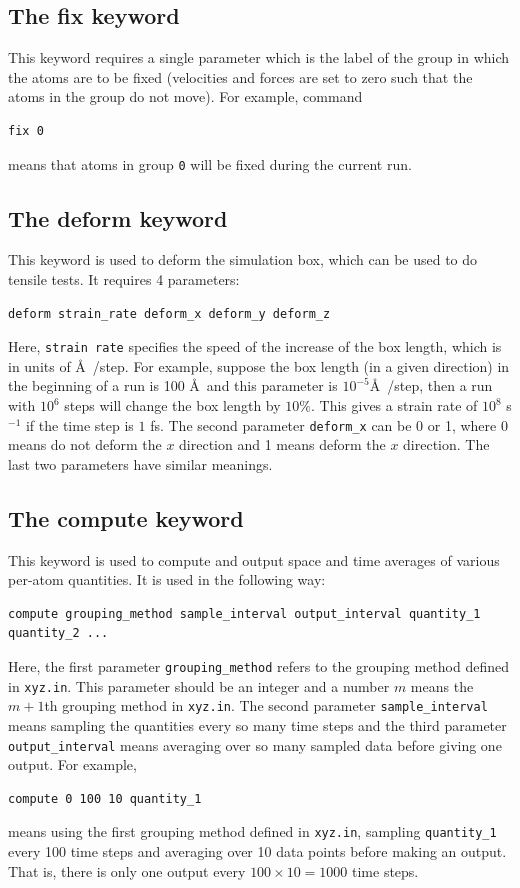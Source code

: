\documentclass[12pt,a4paper]{report}
\begin{document}
\subsection{The fix keyword}

This keyword requires a single parameter which is the label of the group in which the atoms are to be fixed (velocities and forces are set to zero such that the atoms in the group do not move). For example, command
\begin{verbatim}
fix 0
\end{verbatim}
means that atoms in group \verb"0" will be fixed during the current run.


\subsection{The deform keyword}

This keyword is used to deform the simulation box, which can be used to do tensile tests. It requires 4 parameters:
\begin{verbatim}
deform strain_rate deform_x deform_y deform_z
\end{verbatim}
Here, \verb"strain rate" specifies the speed of the increase of the box length, which is in units of \AA~/step. For example, suppose the box length (in a given direction) in the beginning of a run is 100 \AA~and this parameter is $10^{-5}$\AA~/step, then a run with $10^6$ steps will change the box length by $10\%$. This gives a strain rate of $10^8$ s$^{-1}$ if the time step is $1$ fs. The second parameter \verb"deform_x" can be 0 or 1, where 0 means do not deform the $x$ direction and 1 means deform the $x$ direction. The last two parameters have similar meanings. 


\subsection{The compute keyword}

This keyword is used to compute and output space and time averages of various per-atom quantities. It is used in the following way:
\begin{verbatim}
compute grouping_method sample_interval output_interval quantity_1 quantity_2 ...
\end{verbatim}
Here, the first parameter  \verb"grouping_method" refers to the grouping method defined in \verb"xyz.in". This parameter should be an integer and a number $m$ means the $m+1$th grouping method in \verb"xyz.in". The second parameter \verb"sample_interval" means sampling the quantities every so many time steps and the third parameter \verb"output_interval" means averaging over so many sampled data before giving one output. For example, 
\begin{verbatim}
compute 0 100 10 quantity_1
\end{verbatim}
means using the first grouping method defined in \verb"xyz.in", sampling \verb"quantity_1" every 100 time steps and averaging over 10 data points before making an output. That is, there is only one output every $100 \times 10=1000$ time steps. 
\end{document}
